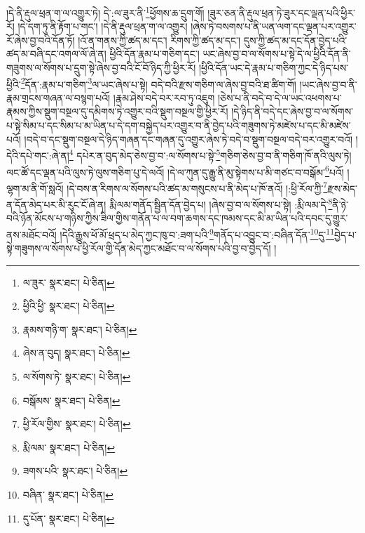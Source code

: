 །དེ་ནི་རྡུལ་ཕྲན་ག་ལ་འགྱུར་ཏེ། དེ་:ལ་ཟུར་ནི་\footnote{ལ་ཟུར་  སྣར་ཐང་།  པེ་ཅིན། }ཕྱོགས་ཆ་དྲུག་གོ། །ཟུར་ཅན་ནི་རྡུལ་ཕྲན་ཏེ་ཟུར་དང་ལྡན་པའི་ཕྱིར་རོ། །དེ་དག་ཏུ་ནི་རྟོག་པ་གང་། །དེ་ནི་རྡུལ་ཕྲན་ག་ལ་འགྱུར། །ཞེས་ཏེ་བསགས་པ་ནི་ཡན་ལག་དང་ལྡན་པར་འགྱུར་རོ་ཞེས་བྱ་བའི་དོན་ཏོ། །འོ་ན་གནས་ཀྱི་ཚད་མ་དང་། རིགས་ཀྱི་ཚད་མ་དང་། དུས་ཀྱི་ཚད་མ་དང་དོན་བྱེད་པའི་ཚད་མ་བཞི་དང་འགལ་ལོ་ཞེ་ན། ཕྱིའི་དོན་རྣམ་པ་གཅིག་དང་། ཡང་ཞེས་བྱ་བ་ལ་སོགས་པ་སྟེ་དེ་ལ་ཕྱིའི་དོན་ནི་གཟུགས་ལ་སོགས་པ་དྲུག་སྟེ་ཞེས་བྱ་བའི་ངོ་བོ་ཉིད་ཀྱི་ཕྱིར་རོ། །ཕྱིའི་དོན་ཡང་དེ་རྣམ་པ་གཅིག་ཀྱང་དེ་ཉིད་པས་ཕྱིའི་\footnote{ཕྱིའི་ཕྱི་  སྣར་ཐང་།  པེ་ཅིན། }དོན་:རྣམ་པ་གཅིག་\footnote{རྣམས་གཉི་ག་  སྣར་ཐང་།  པེ་ཅིན། }ལ་ཡང་ཞེས་པ་སྟེ། བདེ་བའི་རྫས་གཅིག་ལ་ཞེས་བྱ་བའི་ཐ་ཚིག་གོ། །ཡང་ཞེས་བྱ་བ་ནི་རྣམ་གྲངས་གཞན་ལ་བསྙག་པའོ། །རྣམ་ཤེས་བདེ་བར་རབ་ཏུ་འཇུག །ཅེས་པ་ནི་བདེ་བ་དེ་ལ་ཡང་འཕགས་པ་རྣམས་ཀྱིས་སྡུག་བསྔལ་དུ་དམིགས་ཏེ་འགྱུར་བའི་སྡུག་བསྔལ་གྱི་ཕྱིར་རོ། །དེ་ཉིད་ནི་བདེ་དང་ཞེས་བྱ་བ་ལ་སོགས་པ་སྟེ་སིམ་པ་དང་སིམ་པ་མ་ཡིན་པ་དེ་དག་བསྐྱེད་པར་འགྱུར་བ་ནི་བྱེད་པའི་གཟུགས་ཏེ་མཛེས་པ་དང་མི་མཛེས་པའོ། །བདེ་བ་དང་སྡུག་བསྔལ་དེ་ཉིད་གཞན་དང་གཞན་དུ་འགྱུར་ཞེས་ཏེ་བདེ་བ་སྡུག་བསྔལ་བདེ་བར་འགྱུར་བའོ། །དེའི་དཔེ་གང་:ཞེ་ན།\footnote{ཞེས་ན་བུད།  སྣར་ཐང་།  པེ་ཅིན། } དཔེར་ན་བུད་མེད་ཅེས་བྱ་བ་:ལ་སོགས་པ་སྟེ་\footnote{ལ་སོགས་ཏེ་  སྣར་ཐང་།  པེ་ཅིན། }གཅིག་ཅེས་བྱ་བ་ནི་གཅིག་ཁོ་ནའི་ལུས་ཏེ། ལང་ཚོ་དང་ལྡན་པའི་ལུས་ཏེ་ལུས་གཅིག་པུ་དེ་ལའོ། །དེ་ལ་ཀུན་དུ་རྒྱུ་ནི་མུ་སྟེགས་པ་མི་གཙང་བ་བསྒོམ་\footnote{བསྒོམས་  སྣར་ཐང་།  པེ་ཅིན། }པའོ། །ལྷག་མ་ནི་གོ་སླའོ། །དེ་བས་ན་རིགས་ལ་སོགས་པའི་ཚད་མ་གསུངས་པ་ནི་མེད་པ་ཁོ་ནའོ། །:ཕྱི་རོལ་ཀྱི་\footnote{ཕྱི་རོལ་གྱིས་  སྣར་ཐང་།  པེ་ཅིན། }རྫས་མེད་ན་དོན་མེད་པར་མི་རུང་ངོ་ཞེ་ན། རྨི་ལམ་གནོད་སྦྱིན་དོན་བྱེད་པ། །ཞེས་བྱ་བ་ལ་སོགས་པ་སྟེ། :རྨི་ལམ་དེ་\footnote{རྨི་ལམ་  སྣར་ཐང་།  པེ་ཅིན། }ནི་ཉེ་བའི་ཉོན་མོངས་པ་གཉིས་ཀྱིས་ཟིལ་གྱིས་གནོན་པ་ལ་བག་ཆགས་དང་ཁམས་དང་མི་མ་ཡིན་པའི་དབང་དུ་གྱུར་ནས་མཐོང་བའོ། །དེའི་རྒྱུས་ཕོ་མོ་ཕྲད་པ་མེད་ཀྱང་ཁུ་བ་:ཟག་པའི་\footnote{ཟགས་པའི་  སྣར་ཐང་།  པེ་ཅིན། }གནོད་པ་འབྱུང་བ་:བཞིན་དོན་\footnote{བཞིན་  སྣར་ཐང་།  པེ་ཅིན། }དུ་\footnote{དུ་པོན་  སྣར་ཐང་།  པེ་ཅིན། }བྱེད་པ་སྟེ་གཟུགས་ལ་སོགས་པ་ཕྱི་རོལ་གྱི་དོན་མེད་ཀྱང་མཐོང་བ་ལ་སོགས་པའི་བྱ་བ་བྱེད་དོ། །
